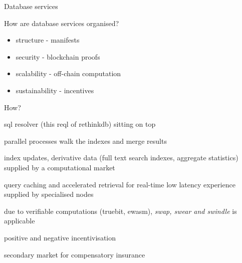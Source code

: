 \documentclass{beamer}
\begin{document}
\begin{section}{Database services}
\begin{frame}{}
\end{frame}



\begin{frame}
\begin{overlayarea}{\textwidth}{10cm}
\begin{block}{How are database services organised?}
\begin{itemize}
\item<1-> structure  - manifests
\item<2-> security - blockchain proofs
\item<3-> scalability - off-chain computation
\item<4-> sustainability - incentives
\end{itemize}
\end{block}
\begin{block}{How?}
\begin{itemize}
{
\item sql resolver (this reql of rethinkdb) sitting on top
\item parallel processes walk the indexes and merge results
\item index updates, derivative data (full text search indexes, aggregate statistics) supplied by a computational market
\item query caching and accelerated retrieval for real-time low latency experience supplied by specialised nodes
}
{
\item due to verifiable computations (truebit, ewasm), \textit{swap, swear and swindle} is applicable
\item positive and negative incentivisation
\item secondary market for compensatory insurance
}
\end{itemize}
\end{block}
\end{overlayarea}
\end{frame}


\end{section}
\end{document}
